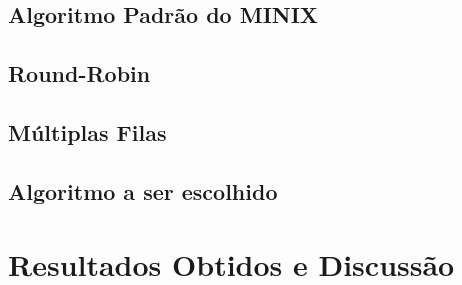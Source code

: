 \documentclass[12pt]{article}
\begin{document}
\subsection{Algoritmo Padrão do MINIX}

\subsection{Round-Robin}
\subsection{Múltiplas Filas}
\subsection{Algoritmo a ser escolhido}

\section{Resultados Obtidos e Discussão}



\end{document}
